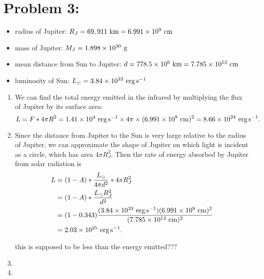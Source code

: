 \documentclass[11pt,letterpaper]{article}
\begin{document}
\section*{Problem 3:}
\begin{itemize}
    \item radius of Jupiter: $R_J = 69,911~{\rm km} = 6.991\times 10^{9}~{\rm cm}$
    \item mass of Jupiter: $M_J = 1.898\times 10^{30}~{\rm g}$
    \item mean distance from Sun to Jupiter: $d = 778.5 \times 10^{6}~{\rm km} = 7.785 \times 10^{13}~{\rm cm}$
    \item luminosity of Sun: $L_\odot = 3.84 \times 10^{33}~{\rm erg\,s^{-1}}$
\end{itemize}

\begin{enumerate}[label=(\alph*)]
    
    \item We can find the total energy emitted in the infrared by multiplying the flux of Jupiter by its surface area:
        \begin{equation*}
            L = F*4\pi R^2 = 1.41\times 10^{4}~{\rm erg\,s^{-1}}\times 4\pi\times (6.991 \times 10^{9}~{\rm cm})^2 = 8.66\times 10^{24}~{\rm erg\,s^{-1}}.
        \end{equation*}
   
    \item Since the distance from Jupiter to the Sun is very large relative to the radius of Jupiter, we can approximate the shape of Jupiter on which light is incident as a circle, which has area $4\pi R_J^2.$ Then the rate of energy absorbed by Jupiter from solar radiation is 
    \begin{align*}
        L &= (1-A)*\frac{L_\odot}{4\pi d^2}*4\pi R_J^2 \\
          &= (1-A)*\frac{L_\odot R_J^2}{d^2} \\
          &= (1-0.343)\frac{(3.84 \times 10^{33}~{\rm erg\,s^{-1}}) (6.991 \times 10^{9}~{\rm cm})^2}{(7.785 \times 10^{13}~{\rm cm})^2} \\
          &= 2.03\times 10^{25}~{\rm erg\,s^{-1}}.
    \end{align*}
    
    {\huge this is supposed to be less than the energy emitted???}

    \item
    \item

\end{enumerate}
\end{document}
